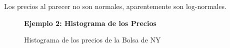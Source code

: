 Los precios al parecer no son normales, aparentemente son log-normales.\\
\begin{figure}[h]
	\centering
	\textbf{Ejemplo 2: Histograma de los Precios}\par\medskip
	\caption{Histograma de los precios de la Bolsa de NY}\label{figura3}
\end{figure}

